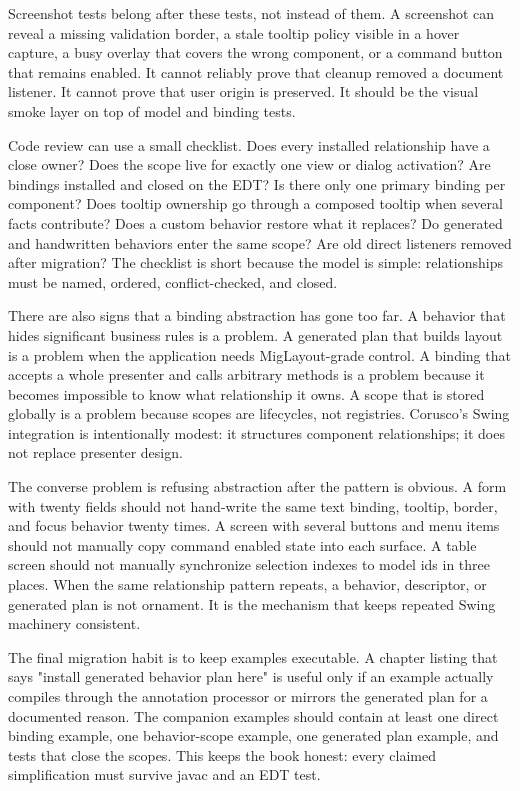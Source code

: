 Screenshot tests belong after these tests, not instead of them. A screenshot
can reveal a missing validation border, a stale tooltip policy visible in a
hover capture, a busy overlay that covers the wrong component, or a command
button that remains enabled. It cannot reliably prove that cleanup removed a
document listener. It cannot prove that user origin is preserved. It should be
the visual smoke layer on top of model and binding tests.

Code review can use a small checklist. Does every installed relationship have
a close owner? Does the scope live for exactly one view or dialog activation?
Are bindings installed and closed on the EDT? Is there only one primary binding
per component? Does tooltip ownership go through a composed tooltip when
several facts contribute? Does a custom behavior restore what it replaces? Do
generated and handwritten behaviors enter the same scope? Are old direct
listeners removed after migration? The checklist is short because the model is
simple: relationships must be named, ordered, conflict-checked, and closed.

There are also signs that a binding abstraction has gone too far. A behavior
that hides significant business rules is a problem. A generated plan that
builds layout is a problem when the application needs MigLayout-grade control.
A binding that accepts a whole presenter and calls arbitrary methods is a
problem because it becomes impossible to know what relationship it owns. A
scope that is stored globally is a problem because scopes are lifecycles, not
registries. Corusco's Swing integration is intentionally modest: it structures
component relationships; it does not replace presenter design.

The converse problem is refusing abstraction after the pattern is obvious. A
form with twenty fields should not hand-write the same text binding, tooltip,
border, and focus behavior twenty times. A screen with several buttons and menu
items should not manually copy command enabled state into each surface. A table
screen should not manually synchronize selection indexes to model ids in three
places. When the same relationship pattern repeats, a behavior, descriptor, or
generated plan is not ornament. It is the mechanism that keeps repeated Swing
machinery consistent.

The final migration habit is to keep examples executable. A chapter listing
that says "install generated behavior plan here" is useful only if an example
actually compiles through the annotation processor or mirrors the generated
plan for a documented reason. The companion examples should contain at least
one direct binding example, one behavior-scope example, one generated plan
example, and tests that close the scopes. This keeps the book honest: every
claimed simplification must survive javac and an EDT test.

